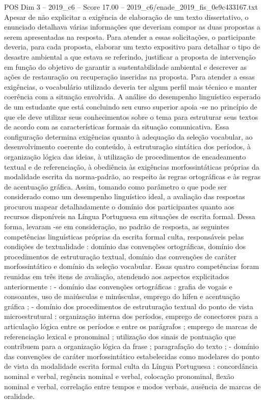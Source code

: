 \begin{textsample}{POS Dim 3 – 2019\_c6 – Score 17.00 – 2019\_c6/enade\_2019\_fis\_0e9c433167.txt}
Apesar de não explicitar a exigência de elaboração de um texto dissertativo, o enunciado detalhava várias informações que deveriam compor as duas propostas a serem apresentadas na resposta.
Para atender a essas solicitações, o participante deveria, para cada proposta, elaborar um texto expositivo para detalhar o tipo de desastre ambiental a que estava se referindo, justificar a proposta de intervenção em função do objetivo de garantir a sustentabilidade ambiental e descrever as ações de restauração ou recuperação inseridas na proposta.
Para atender a essas exigências, o vocabulário utilizado deveria ter algum perfil mais técnico e manter coerência com a situação envolvida.
A análise do desempenho linguístico esperado de um estudante que está concluindo seu curso superior apoia -se no princípio de que ele deve utilizar seus conhecimentos sobre o tema para estruturar seus textos de acordo com as características formais da situação comunicativa.
Essa configuração determina exigências quanto à adequação da seleção vocabular, ao desenvolvimento coerente do conteúdo, à estruturação sintática dos períodos, à organização lógica das ideias, à utilização de procedimentos de encadeamento textual e de referenciação, à obediência às exigências morfossintáticas próprias da modalidade escrita da norma-padrão, ao respeito às regras ortográficas e às regras de acentuação gráfica.
Assim, tomando como parâmetro o que pode ser considerado como um desempenho linguístico ideal, a avaliação das respostas procurou mapear detalhadamente o domínio dos participantes quanto aos recursos disponíveis na Língua Portuguesa em situações de escrita formal.
Dessa forma, levaram -se em consideração, no padrão de resposta, as seguintes competências linguísticas próprias da escrita formal culta, responsáveis pelas condições de textualidade : domínio das convenções ortográficas, domínio dos procedimentos de estruturação textual, domínio das convenções de caráter morfossintático e domínio da seleção vocabular.
Essas quatro competências foram reunidas em três itens de avaliação, atendendo aos aspectos explicitados anteriormente : - domínio das convenções ortográficas : grafia de vogais e consoantes, uso de maiúsculas e minúsculas, emprego do hífen e acentuação gráfica ; - domínio dos procedimentos de estruturação textual do ponto de vista microestrutural : organização interna dos períodos, emprego de conectores para a articulação lógica entre os períodos e entre os parágrafos ; emprego de marcas de referenciação lexical e pronominal ; utilização dos sinais de pontuação que contribuem para a organização lógica da frase ; paragrafação do texto ; - domínio das convenções de caráter morfossintático estabelecidas como modelares do ponto de vista da modalidade escrita formal culta da Língua Portuguesa : concordância nominal e verbal, regência nominal e verbal, colocação pronominal, flexão nominal e verbal, correlação entre tempos e modos verbais, ausência de marcas de oralidade.

\end{textsample}
